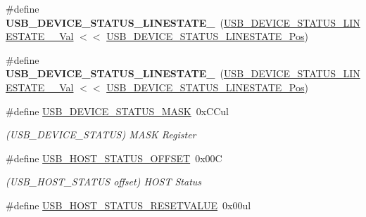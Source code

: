 \begin{DoxyCompactItemize}
\item 
\hypertarget{group___s_a_m_l21___u_s_b_ga83af8c388e648b49d763853c9866b98c}{}\#define {\bfseries U\+S\+B\+\_\+\+D\+E\+V\+I\+C\+E\+\_\+\+S\+T\+A\+T\+U\+S\+\_\+\+L\+I\+N\+E\+S\+T\+A\+T\+E\+\_}~(\hyperlink{group___s_a_m_l21___u_s_b_ga9be5dcded3e3389526af7731a279e9a7}{U\+S\+B\+\_\+\+D\+E\+V\+I\+C\+E\+\_\+\+S\+T\+A\+T\+U\+S\+\_\+\+L\+I\+N\+E\+S\+T\+A\+T\+E\+\_\+\_\+\+Val} $<$$<$ \hyperlink{group___s_a_m_l21___u_s_b_ga8e62dd599a4f4a34806c7677b9eaec13}{U\+S\+B\+\_\+\+D\+E\+V\+I\+C\+E\+\_\+\+S\+T\+A\+T\+U\+S\+\_\+\+L\+I\+N\+E\+S\+T\+A\+T\+E\+\_\+\+Pos})\label{group___s_a_m_l21___u_s_b_ga83af8c388e648b49d763853c9866b98c}

\item 
\hypertarget{group___s_a_m_l21___u_s_b_ga0ef28c02a659e93619fbabfc08dda9ac}{}\#define {\bfseries U\+S\+B\+\_\+\+D\+E\+V\+I\+C\+E\+\_\+\+S\+T\+A\+T\+U\+S\+\_\+\+L\+I\+N\+E\+S\+T\+A\+T\+E\+\_}~(\hyperlink{group___s_a_m_l21___u_s_b_gaff76a55f7d0040b772b73bc0164b9717}{U\+S\+B\+\_\+\+D\+E\+V\+I\+C\+E\+\_\+\+S\+T\+A\+T\+U\+S\+\_\+\+L\+I\+N\+E\+S\+T\+A\+T\+E\+\_\+\_\+\+Val} $<$$<$ \hyperlink{group___s_a_m_l21___u_s_b_ga8e62dd599a4f4a34806c7677b9eaec13}{U\+S\+B\+\_\+\+D\+E\+V\+I\+C\+E\+\_\+\+S\+T\+A\+T\+U\+S\+\_\+\+L\+I\+N\+E\+S\+T\+A\+T\+E\+\_\+\+Pos})\label{group___s_a_m_l21___u_s_b_ga0ef28c02a659e93619fbabfc08dda9ac}

\item 
\hypertarget{group___s_a_m_l21___u_s_b_ga4b9317688bbac4ee71ae1032c4a47cae}{}\#define \hyperlink{group___s_a_m_l21___u_s_b_ga4b9317688bbac4ee71ae1032c4a47cae}{U\+S\+B\+\_\+\+D\+E\+V\+I\+C\+E\+\_\+\+S\+T\+A\+T\+U\+S\+\_\+\+M\+A\+S\+K}~0x\+C\+Cul\label{group___s_a_m_l21___u_s_b_ga4b9317688bbac4ee71ae1032c4a47cae}

\begin{DoxyCompactList}\small\item\em (U\+S\+B\+\_\+\+D\+E\+V\+I\+C\+E\+\_\+\+S\+T\+A\+T\+U\+S) M\+A\+S\+K Register \end{DoxyCompactList}\item 
\hypertarget{group___s_a_m_l21___u_s_b_gacc6a4375d1eb5f80b94d60fc9abcaf3a}{}\#define \hyperlink{group___s_a_m_l21___u_s_b_gacc6a4375d1eb5f80b94d60fc9abcaf3a}{U\+S\+B\+\_\+\+H\+O\+S\+T\+\_\+\+S\+T\+A\+T\+U\+S\+\_\+\+O\+F\+F\+S\+E\+T}~0x00\+C\label{group___s_a_m_l21___u_s_b_gacc6a4375d1eb5f80b94d60fc9abcaf3a}

\begin{DoxyCompactList}\small\item\em (U\+S\+B\+\_\+\+H\+O\+S\+T\+\_\+\+S\+T\+A\+T\+U\+S offset) H\+O\+S\+T Status \end{DoxyCompactList}\item 
\hypertarget{group___s_a_m_l21___u_s_b_ga429f288a9d0060ab087da7b2594075e9}{}\#define \hyperlink{group___s_a_m_l21___u_s_b_ga429f288a9d0060ab087da7b2594075e9}{U\+S\+B\+\_\+\+H\+O\+S\+T\+\_\+\+S\+T\+A\+T\+U\+S\+\_\+\+R\+E\+S\+E\+T\+V\+A\+L\+U\+E}~0x00ul\label{group___s_a_m_l21___u_s_b_ga429f288a9d0060ab087da7b2594075e9}


\end{DoxyCompactItemize}
